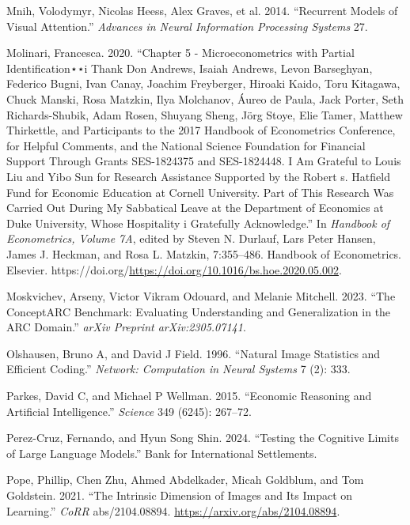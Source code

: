 \documentclass[
]{article}
\newlength{\cslhangindent}
\newenvironment{CSLReferences}[2] %
 {\begin{list}{}{%
  \setlength{\itemindent}{0pt}
  \setlength{\leftmargin}{0pt}
  \setlength{\parsep}{0pt}
  \ifodd #1
   \setlength{\leftmargin}{\cslhangindent}
   \setlength{\itemindent}{-1\cslhangindent}
  \fi
  \setlength{\itemsep}{#2\baselineskip}}}
 {\end{list}}
\begin{document}
\begin{CSLReferences}{1}{0}
Mnih, Volodymyr, Nicolas Heess, Alex Graves, et al. 2014. {``Recurrent
Models of Visual Attention.''} \emph{Advances in Neural Information
Processing Systems} 27.

Molinari, Francesca. 2020. {``Chapter 5 - Microeconometrics with Partial
Identification⋆⋆i Thank Don Andrews, Isaiah Andrews, Levon Barseghyan,
Federico Bugni, Ivan Canay, Joachim Freyberger, Hiroaki Kaido, Toru
Kitagawa, Chuck Manski, Rosa Matzkin, Ilya Molchanov, Áureo de Paula,
Jack Porter, Seth Richards-Shubik, Adam Rosen, Shuyang Sheng, Jörg
Stoye, Elie Tamer, Matthew Thirkettle, and Participants to the 2017
Handbook of Econometrics Conference, for Helpful Comments, and the
National Science Foundation for Financial Support Through Grants
SES-1824375 and SES-1824448. I Am Grateful to Louis Liu and Yibo Sun for
Research Assistance Supported by the Robert s. Hatfield Fund for
Economic Education at Cornell University. Part of This Research Was
Carried Out During My Sabbatical Leave at the Department of Economics at
Duke University, Whose Hospitality i Gratefully Acknowledge.''} In
\emph{Handbook of Econometrics, Volume 7A}, edited by Steven N. Durlauf,
Lars Peter Hansen, James J. Heckman, and Rosa L. Matzkin, 7:355--486.
Handbook of Econometrics. Elsevier.
https://doi.org/\url{https://doi.org/10.1016/bs.hoe.2020.05.002}.

Moskvichev, Arseny, Victor Vikram Odouard, and Melanie Mitchell. 2023.
{``The ConceptARC Benchmark: Evaluating Understanding and Generalization
in the ARC Domain.''} \emph{arXiv Preprint arXiv:2305.07141}.

Olshausen, Bruno A, and David J Field. 1996. {``Natural Image Statistics
and Efficient Coding.''} \emph{Network: Computation in Neural Systems} 7
(2): 333.

Parkes, David C, and Michael P Wellman. 2015. {``Economic Reasoning and
Artificial Intelligence.''} \emph{Science} 349 (6245): 267--72.

Perez-Cruz, Fernando, and Hyun Song Shin. 2024. {``Testing the Cognitive
Limits of Large Language Models.''} Bank for International Settlements.

Pope, Phillip, Chen Zhu, Ahmed Abdelkader, Micah Goldblum, and Tom
Goldstein. 2021. {``The Intrinsic Dimension of Images and Its Impact on
Learning.''} \emph{CoRR} abs/2104.08894.
\url{https://arxiv.org/abs/2104.08894}.


\end{CSLReferences}
\end{document}
